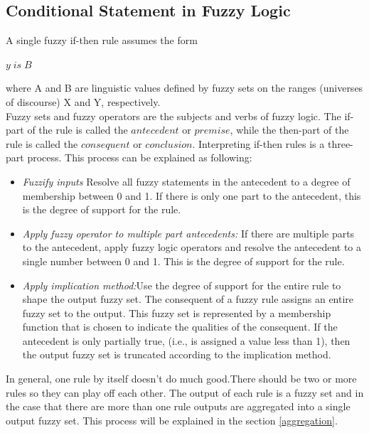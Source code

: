 \documentclass{article}
\begin{document}
\subsection{Conditional Statement in Fuzzy Logic}

A single fuzzy if-then rule assumes the form 
\begin{algorithmic}
    \State $y \;is\; B$
\EndIf
\end{algorithmic}

%
where A and B are linguistic values defined by fuzzy sets on the ranges (universes of discourse) X and Y, respectively.\\
Fuzzy sets and fuzzy operators are the subjects and verbs of fuzzy logic. 
The if-part of the rule is called the $antecedent$ or $premise$, while the then-part of the rule is called
the $consequent$ or $conclusion$.
Interpreting if-then rules is a three-part process. This process can be explained as following:
\begin{itemize}
\item \textit{Fuzzify inputs} 
Resolve all fuzzy statements in the antecedent to a degree of
membership between 0 and 1. If there is only one part to the antecedent, this
is the degree of support for the rule.
\item \textit{Apply fuzzy operator to multiple part antecedents:}
If there are multiple parts
to the antecedent, apply fuzzy logic operators and resolve the antecedent to
a single number between 0 and 1. This is the degree of support for the rule.

\item \textit{Apply implication method:}Use the degree of support for the entire rule to
shape the output fuzzy set. The consequent of a fuzzy rule assigns an entire
fuzzy set to the output. This fuzzy set is represented by a membership
function that is chosen to indicate the qualities of the consequent. If the
antecedent is only partially true, (i.e., is assigned a value less than 1), then
the output fuzzy set is truncated according to the implication method.

\end{itemize}

 
In general, one rule by itself doesn't do much good.There should be two or
more rules so they can play off each other. The output of each rule is a fuzzy set
and in the case that there are more than one rule outputs are aggregated into a single output
fuzzy set. This process will be explained in the section \ref{aggregation}.
\end{document}
